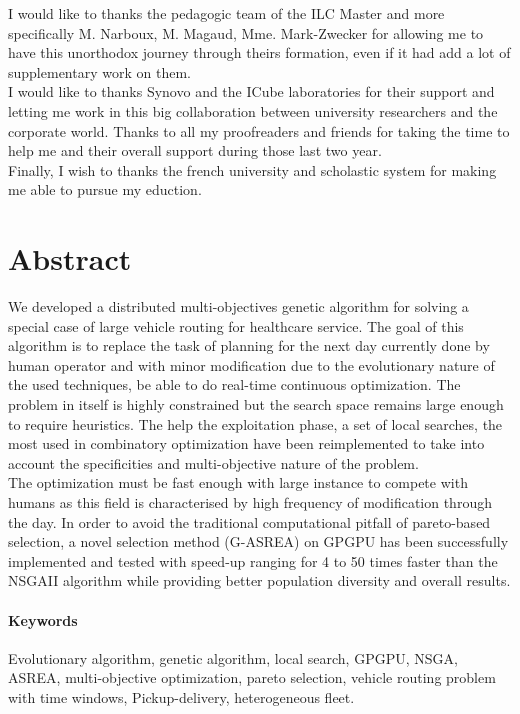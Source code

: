 \documentclass[12pt]{memoir}
\begin{document}
\bigskip
I would like to thanks the pedagogic team of the ILC Master and more specifically M. Narboux, M. Magaud, Mme. Mark-Zwecker for allowing me to have this unorthodox journey through theirs formation, even if it had add a lot of supplementary work on them. \\
I would like to thanks Synovo and the ICube laboratories for their support and
letting me work in this big collaboration between university researchers and the
corporate world.
Thanks to all my proofreaders and friends for taking the time to help me and their overall support during those last two year. \\
Finally, I wish to thanks the french university and scholastic system for making me able to pursue my eduction.  
\newpage

\section{Abstract}
We developed a distributed multi-objectives genetic algorithm for solving a special case of
large vehicle routing for healthcare service. The goal of this algorithm is to
replace the task of planning for the next day currently done by human operator and with
minor modification due to the evolutionary nature of the used techniques, be able to
do real-time continuous optimization. The problem in itself is highly constrained
but the search space remains large enough to require heuristics. The help the
exploitation phase, a set of local searches, the most used in combinatory
optimization have been reimplemented to take into account the specificities and
multi-objective nature of the problem. \\
The optimization must be fast enough with large instance to compete with humans as
this field is characterised by high frequency of modification through the day. In
order to avoid the traditional computational pitfall of pareto-based selection, a
novel selection method (G-ASREA) on GPGPU has been successfully implemented and tested with
speed-up ranging for 4 to 50 times faster than the NSGAII algorithm while providing
better population diversity and overall results.
\paragraph{Keywords}
Evolutionary algorithm, genetic algorithm, local search, GPGPU, NSGA, ASREA, multi-objective optimization, pareto selection, vehicle routing problem with time windows, Pickup-delivery, heterogeneous fleet.
\newpage
\end{document}
